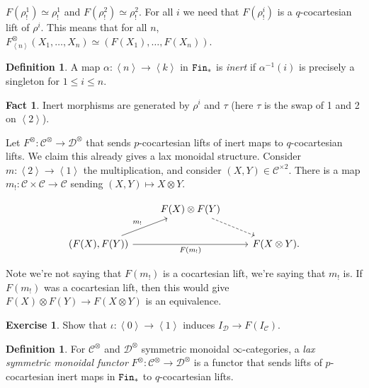 \documentclass[12pt]{amsart}
\theoremstyle{definition}
\newtheorem{definition}[theorem]{Definition}
\newtheorem{exercise}[theorem]{Exercise}
\newtheorem{fact}[theorem]{Fact}
\begin{document}
$F(\rho^1_!) \simeq \rho^1_!$ and $F(\rho^2_!) \simeq \rho^2_!$. For all $i$ we need that $F(\rho_!^i)$ is a $q$-cocartesian lift of $\rho^i$. This means that for all $n$, $F^{\otimes}_{\left\langle n \right\rangle}(X_1, \ldots, X_n) \simeq \left( F(X_1), \ldots, F(X_n) \right)$.

\begin{definition} A map $\alpha: \left\langle n \right\rangle \to \left\langle k \right\rangle$ in $\texttt{Fin}_\ast$ is \textit{inert} if $\alpha^{-1}(i)$ is precisely a singleton for $1\le i\le n$.
\end{definition}

\begin{fact} Inert morphisms are generated by $\rho^i$ and $\tau$ (here $\tau$ is the swap of 1 and 2 on $\left\langle 2 \right\rangle$).
\end{fact}

Let $F^{\otimes}: \mathscr{C}^\otimes \to \mathscr{D}^{\otimes}$ that sends $p$-cocartesian lifts of inert maps to $q$-cocartesian lifts. We claim this already gives a lax monoidal structure. Consider $m : \left\langle 2  \right\rangle\to \left\langle 1 \right\rangle$ the multiplication, and consider $(X,Y) \in \mathscr{C}^{\times 2}$. There is a map $m_!: \mathscr{C} \times \mathscr{C} \to \mathscr{C}$ sending $(X,Y) \mapsto X \otimes Y$.

\[ \begin{tikzcd}
     & F(X) \otimes F(Y)\ar[dr,dashed] & \\
    {(F(X),F(Y))}\ar[ur,"m_!" above left]\ar[rr,"F(m_!)" below] &  & F(X \otimes Y).
\end{tikzcd} \]

Note we're not saying that $F(m_!)$ is a cocartesian lift, we're saying that $m_!$ is. If $F(m_!)$ was a cocartesian lift, then this would give $F(X) \otimes F(Y) \to F(X \otimes Y)$ is an equivalence.

\begin{exercise} Show that $\iota: \left\langle 0 \right\rangle \to \left\langle 1 \right\rangle$ induces $I_\mathscr{D} \to F(I_\mathscr{C})$.
\end{exercise}


\begin{definition} For $\mathscr{C}^{\otimes}$ and $\mathscr{D}^{\otimes}$ symmetric monoidal $\infty$-categories, a \textit{lax symmetric monoidal functor} $F^{\otimes} : \mathscr{C}^{\otimes} \to \mathscr{D}^{\otimes}$ is a functor that sends lifts of $p$-cocartesian inert maps in $\texttt{Fin}_\ast$ to $q$-cocartesian lifts.
\end{definition}
\end{document}
